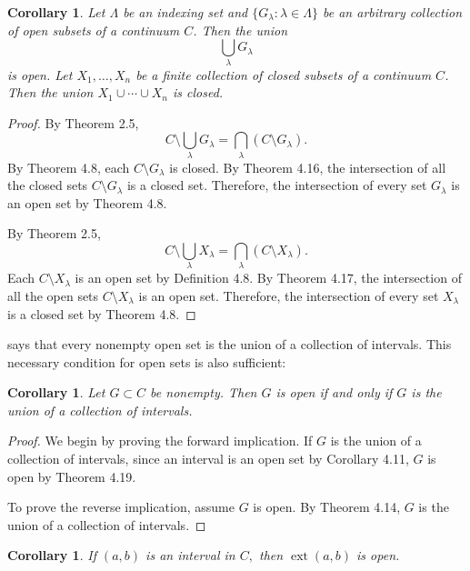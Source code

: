 \documentclass{amsart}
\newtheorem{corollary}[theorem]{Corollary}
\newcommand{\1}{\mathds{1}}
\DeclareMathOperator{\ext}{ext}
\numberwithin{equation}{section}
\numberwithin{theorem}{section}
\begin{document}
\begin{corollary}\label{fortop2} 
	Let $\Lambda$ be an indexing set and $\{G_{\lambda} : \lambda \in \Lambda \}$ be an arbitrary collection of open subsets of a continuum $C$.  Then the union
	\[
	\bigcup_{\lambda} G_{\lambda}
	\]
	is open.  Let $X_1, \dotsc, X_n$ be a finite collection of closed subsets of a continuum $C$.  Then the union $X_1 \cup \dotsm \cup X_n$ is closed.
\end{corollary}

\begin{proof}
	By Theorem 2.5, 
	\[
	C\setminus \bigcup_{\lambda} G_{\lambda} = \bigcap_{\lambda} \left( C\setminus G_{\lambda}\right).
	\]
	By Theorem 4.8, each $C\setminus G_{\lambda}$ is closed. By Theorem 4.16, the intersection of all the closed sets $C\setminus G_{\lambda}$ is a closed set. Therefore, the intersection of every set $G_{\lambda}$ is an open set by Theorem 4.8.
	
	By Theorem 2.5,
	\[
	C\setminus \bigcup_{\lambda} X_{\lambda} = \bigcap_{\lambda} \left( C\setminus X_{\lambda}\right).
	\]
	Each $C\setminus X_{\lambda}$ is an open set by Definition 4.8. By Theorem 4.17, the intersection of all the open sets $C\setminus X_{\lambda}$ is an open set. Therefore, the intersection of every set $X_{\lambda}$ is a closed set by Theorem 4.8.
\end{proof}

 says that every nonempty open set is the union of a collection of intervals.  This necessary condition for open sets is also sufficient:


 \begin{corollary}
 Let $G \subset C$ be nonempty.  Then $G$ is open if and only if $G$ is the union of a collection of intervals.
\end{corollary}

\begin{proof}
	We begin by proving the forward implication. If $G$ is the union of a collection of intervals, since an interval is an open set by Corollary 4.11, $G$ is open by Theorem 4.19.
	
	To prove the reverse implication, assume $G$ is open. By Theorem 4.14, $G$ is the union of a collection of intervals.
\end{proof}

\begin{corollary} If $(a, b)$ is an interval in $C,$ then $\ext(a,b)$ is open.
\end{corollary} 
\end{document}
